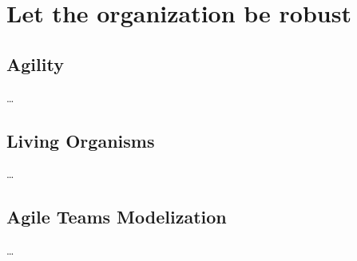 
%

\begin{frame}[t,plain]
  \maketitle
\end{frame}

\begin{frame}
  \tableofcontents
\end{frame}

\section{Let the organization be robust}

  \begin{frame}
    \tableofcontents[currentsection]
  \end{frame}

%
\subsection{Agility}

  \begin{frame}{\insertsection}
    \dots
  \end{frame}

%
\subsection{Living Organisms}

  \begin{frame}{\insertsection}
    \dots
  \end{frame}

%
\subsection{Agile Teams Modelization}

  \begin{frame}{\insertsection}
    \dots
  \end{frame}

